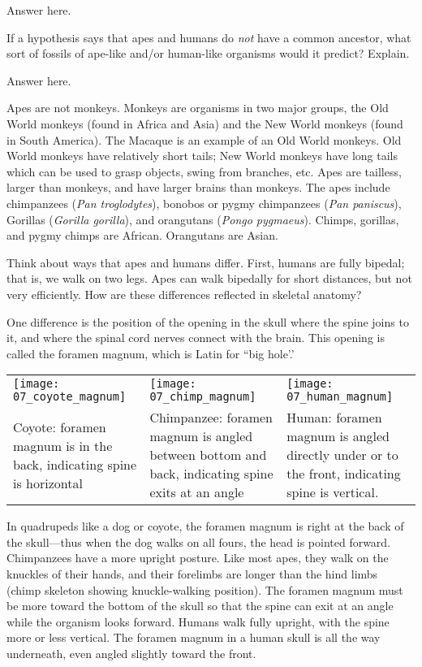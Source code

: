 \documentclass[12pt, hidelinks]{exam}
\newcommand*\AnswerBox[2]{%
    \parbox[t][#1]{0.92\textwidth}{%
    \begin{solution}#2\end{solution}}
}
\begin{document}
\begin{questions}
\AnswerBox{3\baselineskip}{%
Answer here.
}

\question[2]
If a hypothesis says that apes and humans do \emph{not} have a
common ancestor, what sort of fossils of ape-like and/or human-like
organisms would it predict? Explain.

\AnswerBox{3\baselineskip}{%
Answer here.
}

Apes are not monkeys. Monkeys are organisms in two major groups, the Old
World monkeys (found in Africa and Asia) and the New World monkeys
(found in South America). The Macaque is an example of an Old World monkeys. Old World monkeys have relatively short tails;
New World monkeys have long tails which can be used to grasp objects,
swing from branches, etc. Apes are tailless, larger than monkeys, and
have larger brains than monkeys. The apes include chimpanzees (\emph{Pan
troglodytes}), bonobos or pygmy chimpanzees (\emph{Pan paniscus}),
Gorillas (\emph{Gorilla gorilla}), and orangutans (\emph{Pongo
pygmaeus}). Chimps, gorillas, and pygmy chimps are African. Orangutans are
Asian.

Think about ways that apes and humans differ. First, humans are fully
bipedal; that is, we walk on two legs. Apes can walk bipedally for short
distances, but not very efficiently. How are these differences reflected
in skeletal anatomy?

One difference is the position of the opening in the skull where the
spine joins to it, and where the spinal cord nerves connect with the
brain. This opening is called the foramen magnum, which is Latin for
``big hole'.'

\begin{longtable}[c]{@{}L{0.31\textwidth}L{0.31\textwidth}L{0.31\textwidth}@{}}
\texttt{[image: 07\_coyote\_magnum]} &
\texttt{[image: 07\_chimp\_magnum]} &
\texttt{[image: 07\_human\_magnum]} \\
Coyote: foramen magnum is in the back, indicating spine is
horizontal & 
Chimpanzee: foramen magnum is angled between bottom
and back, indicating spine exits at an angle & 
Human: foramen
magnum is angled directly under or to the front, indicating spine is
vertical.\tabularnewline
\bottomrule
\end{longtable}

In quadrupeds like a dog or coyote, the foramen magnum is right at the
back of the skull—thus when the dog walks on all fours, the head is
pointed forward. Chimpanzees have a more upright posture. Like most
apes, they walk on the knuckles of their hands, and their forelimbs are
longer than the hind limbs (chimp skeleton showing knuckle-walking
position). The foramen magnum must be more toward the bottom of the
skull so that the spine can exit at an angle while the organism looks
forward. Humans walk fully upright, with the spine more or less
vertical. The foramen magnum in a human skull is all the way underneath,
even angled slightly toward the front.


\end{questions}
\end{document}
